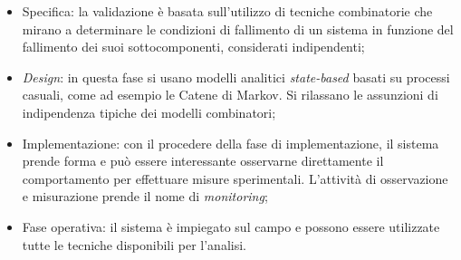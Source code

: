 \begin{itemize}
	\item Specifica: la validazione \`e basata sull'utilizzo di tecniche combinatorie che mirano a determinare le condizioni di fallimento di un sistema in funzione del fallimento dei suoi sottocomponenti, considerati indipendenti;
	\item \emph{Design}: in questa fase si usano modelli analitici \emph{state-based} basati su processi casuali, come ad esempio le Catene di Markov. Si rilassano le assunzioni di indipendenza tipiche dei modelli combinatori;
	\item Implementazione: con il procedere della fase di implementazione, il sistema prende forma e pu\`o essere interessante osservarne direttamente il comportamento per effettuare misure sperimentali. L'attivit\`a di osservazione e misurazione prende il nome di \emph{monitoring};
	\item Fase operativa: il sistema \`e impiegato sul campo e possono essere utilizzate tutte le tecniche disponibili per l'analisi.
\end{itemize}
